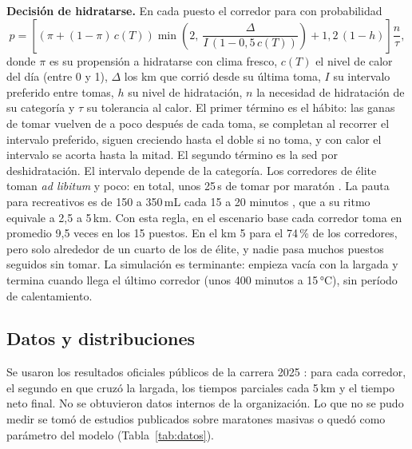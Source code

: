\documentclass[11pt,a4paper]{article}
\begin{document}
\textbf{Decisión de hidratarse.} En cada puesto el corredor para con probabilidad
\begin{equation}
    p = \left[ \left( \pi + (1-\pi)\,c(T) \right) \min\!\left(2,\ \frac{\Delta}{I\,(1 - 0{,}5\,c(T))}\right) + 1{,}2\,(1-h) \right] \frac{n}{\tau},
\end{equation}
donde $\pi$ es su propensión a hidratarse con clima fresco, $c(T)$ el nivel de calor del día (entre 0 y 1), $\Delta$ los km que corrió desde su última toma, $I$ su intervalo preferido entre tomas, $h$ su nivel de hidratación, $n$ la necesidad de hidratación de su categoría y $\tau$ su tolerancia al calor. El primer término es el hábito: las ganas de tomar vuelven de a poco después de cada toma, se completan al recorrer el intervalo preferido, siguen creciendo hasta el doble si no toma, y con calor el intervalo se acorta hasta la mitad. El segundo término es la sed por deshidratación. El intervalo depende de la categoría. Los corredores de élite toman \emph{ad libitum} y poco: en total, unos 25\,s de tomar por maratón \cite{beis}. La pauta para recreativos es de 150 a 350\,mL cada 15 a 20 minutos \cite{acsm}, que a su ritmo equivale a 2,5 a 5\,km. Con esta regla, en el escenario base cada corredor toma en promedio 9,5 veces en los 15 puestos. En el km 5 para el 74\,\% de los corredores, pero solo alrededor de un cuarto de los de élite, y nadie pasa muchos puestos seguidos sin tomar. La simulación es terminante: empieza vacía con la largada y termina cuando llega el último corredor (unos 400 minutos a 15\,°C), sin período de calentamiento.

\subsection{Datos y distribuciones}

Se usaron los resultados oficiales públicos de la carrera 2025 \cite{raceresult}: para cada corredor, el segundo en que cruzó la largada, los tiempos parciales cada 5\,km y el tiempo neto final. No se obtuvieron datos internos de la organización. Lo que no se pudo medir se tomó de estudios publicados sobre maratones masivas o quedó como parámetro del modelo (Tabla~\ref{tab:datos}).
\end{document}
